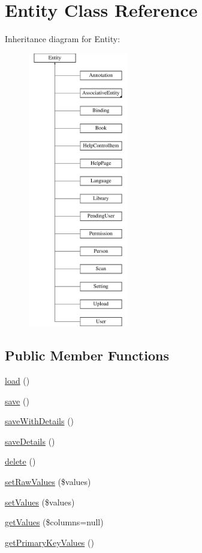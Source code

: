\hypertarget{classEntity}{
\section{Entity Class Reference}
\label{classEntity}
}
Inheritance diagram for Entity:\begin{figure}[H]
\begin{center}
\leavevmode
\includegraphics[height=12.000000cm]{classEntity}
\end{center}
\end{figure}
\subsection*{Public Member Functions}
\begin{DoxyCompactItemize}
\item 
\hyperlink{classEntity_af2decf2a7bc0aef76e5adcd46a192e05}{load} ()
\item 
\hyperlink{classEntity_af4822c7e840cf775ca98c2fce2d8de49}{save} ()
\item 
\hyperlink{classEntity_ae8393dc2e8bc1fda9a5f47a145753b76}{saveWithDetails} ()
\item 
\hyperlink{classEntity_a48cdc3830bf695078a69a56f23e1b874}{saveDetails} ()
\item 
\hyperlink{classEntity_a59eae3c476f3996973400a024097c87e}{delete} ()
\item 
\hyperlink{classEntity_a4e945653aab38681177186fdc4787248}{setRawValues} (\$values)
\item 
\hyperlink{classEntity_ad346277daf8194b3c572ebdc82e435f3}{setValues} (\$values)
\item 
\hyperlink{classEntity_aec1be209327cfcf2dc528a3a565a7a5f}{getValues} (\$columns=null)
\item 
\hyperlink{classEntity_a659a3f3946feb4fd3301fe3f8f6d4851}{getPrimaryKeyValues} ()
\end{DoxyCompactItemize}
